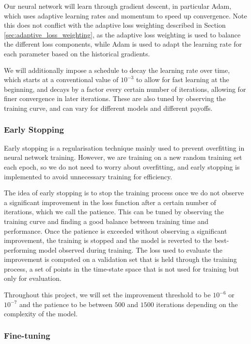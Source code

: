 Our neural network will learn through gradient descent, in particular Adam, which uses adaptive learning rates and momentum to speed up convergence. Note this does not conflict with the adaptive loss weighting described in Section \ref{sec:adaptive_loss_weighting}, as the adaptive loss weighting is used to balance the different loss components, while Adam is used to adapt the learning rate for each parameter based on the historical gradients.

We will additionally impose a schedule to decay the learning rate over time, which starts at a conventional value of $10^{-3}$ to allow for fast learning at the beginning, and decays by a factor every certain number of iterations, allowing for finer convergence in later iterations. These are also tuned by observing the training curve, and can vary for different models and different payoffs.

\subsubsection{Early Stopping}

Early stopping is a regularisation technique mainly used to prevent overfitting in neural network training. However, we are training on a new random training set each epoch, so we do not need to worry about overfitting, and early stopping is implemented to avoid unnecessary training for efficiency.

The idea of early stopping is to stop the training process once we do not observe a significant improvement in the loss function after a certain number of iterations, which we call the patience. This can be tuned by observing the training curve and finding a good balance between training time and performance. Once the patience is exceeded without observing a significant improvement, the training is stopped and the model is reverted to the best-performing model observed during training. The loss used to evaluate the improvement is computed on a validation set that is held through the training process, a set of points in the time-state space that is not used for training but only for evaluation.

Throughout this project, we will set the improvement threshold to be $10^{-6}$ or $10^{-7}$ and the patience to be between $500$ and $1500$ iterations depending on the complexity of the model.

\subsubsection{Fine-tuning}

